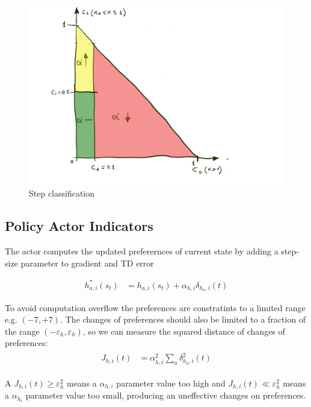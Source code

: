 \documentclass[]{article}
\begin{document}
\begin{figure}[ht]
	\centering
	\includegraphics[width=\linewidth]{ann.png}
	\caption{Step classification}
	\label{fig:steps}
\end{figure}

\subsection{Policy Actor Indicators}

The actor computes the updated preferernces of current state by adding a step-size parameter to gradient and TD error

\begin{align*}
	h_{a, i}^*(s_t)&	= h_{a, i}(s_t) + \alpha_{h, i} \delta_{h_a, i}(t)
\end{align*}

To avoid computation overflow the preferences are constratints to a limited range e.g. $ (-7, +7) $.
The changes of preferences should also be limited to a fraction of the range $ (-\varepsilon_h, \varepsilon_h) $, so we can measure the squared distance of changes of preferences:
\begin{align}
\begin{split}
	J_{h,i}(t)&		= \alpha_{h, i}^2 \sum_a \delta_{h_a, i}^2(t)
\end{split}
\end{align}

A $ J_{h,i}(t) \ge \varepsilon_h^2 $ means a $ \alpha_{h,i} $ parameter value too high and $ J_{h,i}(t) \ll \varepsilon_h^2 $ means a $ \alpha_{h_i} $ parameter value too small, producing an uneffective changes on preferences.
\end{document}
